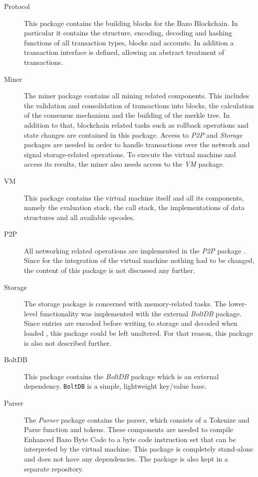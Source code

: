 \begin{description}
	\item[Protocol] This package contains the building blocks for the Bazo Blockchain. In particular it contains the structure, encoding, decoding and hashing functions of all transaction types, blocks and accounts. In addition a transaction interface is defined, allowing an abstract treatment of transactions. \cite{ba_miner}
	\item[Miner] The miner package contains all mining related components. This includes the validation and consolidation of transactions into blocks, the calculation of the consensus mechanism and the building of the merkle tree. In addition to that, blockchain related tasks such as rollback operations and state changes are contained in this package. Access to \textit{P2P} and \textit{Storage} packages are needed in order to handle transactions over the network and signal storage-related operations. \cite{ba_miner} To execute the virtual machine and access its results, the miner also needs access to the \textit{VM} package.
	\item[VM] This package contains the virtual machine itself and all its components, namely the evaluation stack, the call stack, the implementations of data structures and all available opcodes.
	\item[P2P] All networking related operations are implemented in the \textit{P2P} package \cite{ba_miner}. Since for the integration of the virtual machine nothing had to be changed, the content of this package is not discussed any further.
	\item[Storage] The storage package is concerned with memory-related tasks. The lower-level functionality was implemented with the external \textit{BoltDB} package. Since entries are encoded before writing to storage and decoded when loaded \cite{ba_miner}, this package could be left unaltered. For that reason, this package is also not described further.
	\item[BoltDB] This package contains the \textit{BoltDB} package which is an external dependency. \texttt{BoltDB} is a simple, lightweight key/value base. \cite{ba_miner}
	\item[Parser] The \textit{Parser} package contains the parser, which consists of a Tokenize and Parse function and tokens. These components are needed to compile \flqq Enhanced Bazo Byte Code\frqq{ } to a byte code instruction set that can be interpreted by the virtual machine. This package is completely stand-alone and does not have any dependencies. The package is also kept in a separate repository.
\end{description}


